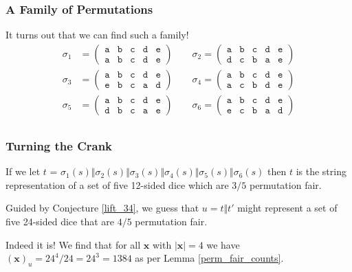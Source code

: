 \documentclass[aspectratio=169]{beamer}
\begin{document}
\begin{frame}[triangle=siiblue]
\frametitle{A Family of Permutations}
It turns out that we can find such a family!
\begin{align*}
	\sigma_1 &= \begin{pmatrix}
		\texttt{a} & \texttt{b} & \texttt{c} & \texttt{d} & \texttt{e} \\
		\texttt{a} & \texttt{b} & \texttt{c} & \texttt{d} & \texttt{e}
		\end{pmatrix}
	\qquad
	\sigma_2 = \begin{pmatrix}
		\texttt{a} & \texttt{b} & \texttt{c} & \texttt{d} & \texttt{e} \\
		\texttt{d} & \texttt{c} & \texttt{b} & \texttt{a} & \texttt{e}
		\end{pmatrix} \\
	\sigma_3 &= \begin{pmatrix}
		\texttt{a} & \texttt{b} & \texttt{c} & \texttt{d} & \texttt{e} \\
		\texttt{e} & \texttt{b} & \texttt{c} & \texttt{a} & \texttt{d}
		\end{pmatrix}
	\qquad
	\sigma_4 = \begin{pmatrix}
		\texttt{a} & \texttt{b} & \texttt{c} & \texttt{d} & \texttt{e} \\
		\texttt{a} & \texttt{c} & \texttt{b} & \texttt{d} & \texttt{e}
		\end{pmatrix} \\
	\sigma_5 &= \begin{pmatrix}
		\texttt{a} & \texttt{b} & \texttt{c} & \texttt{d} & \texttt{e} \\
		\texttt{d} & \texttt{b} & \texttt{c} & \texttt{a} & \texttt{e}
		\end{pmatrix}
	\qquad
	\sigma_6 = \begin{pmatrix}
		\texttt{a} & \texttt{b} & \texttt{c} & \texttt{d} & \texttt{e} \\
		\texttt{e} & \texttt{c} & \texttt{b} & \texttt{a} & \texttt{d}
		\end{pmatrix} \\
\end{align*}
\end{frame}

\begin{frame}[triangle=siiblue]
\frametitle{Turning the Crank}
If we let $t$ = $\sigma_1(s) \Vert \sigma_2(s) \Vert \sigma_3(s) \Vert \sigma_4(s) \Vert \sigma_5(s) \Vert \sigma_6(s)$ then $t$ is the string representation of a set of five 12-sided dice which are $3/5$ permutation fair. 

\vfill

Guided by Conjecture \ref{lift_34}, we guess that $u = t \Vert t'$ might represent a set of five 24-sided dice that are $4/5$ permutation fair.

\vfill

Indeed it is!  We find that for all $\mathbf{x}$ with $|\mathbf{x}| = 4$ we have $(\mathbf{x})_u = 24^4 / 24 = 24^3 = 1384$ as per Lemma \ref{perm_fair_counts}.
\end{frame}
\end{document}
